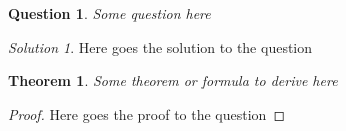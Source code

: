 \documentclass[a4paper,11pt]{book}
\newtheorem{theorem}{Theorem}
\newtheorem{question}{Question}
\theoremstyle{remark}
\newtheorem*{solution}{Solution}
\begin{document}
\begin{question}
Some question here
\end{question}

\begin{solution}
Here goes the solution to the question
\end{solution}

\begin{theorem}
Some theorem or formula to derive here
\end{theorem}

\begin{proof}
Here goes the proof to the question
\end{proof}
\end{document}
